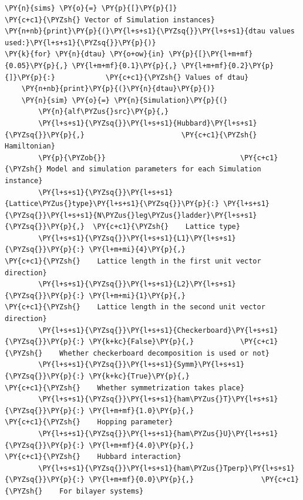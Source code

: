     \begin{tcolorbox}[breakable, size=fbox, boxrule=1pt, pad at break*=1mm,colback=cellbackground, colframe=cellborder]
\begin{Verbatim}[commandchars=\\\{\}]
\PY{n}{sims} \PY{o}{=} \PY{p}{[}\PY{p}{]}                                \PY{c+c1}{\PYZsh{} Vector of Simulation instances}
\PY{n+nb}{print}\PY{p}{(}\PY{l+s+s1}{\PYZsq{}}\PY{l+s+s1}{dtau values used:}\PY{l+s+s1}{\PYZsq{}}\PY{p}{)}
\PY{k}{for} \PY{n}{dtau} \PY{o+ow}{in} \PY{p}{[}\PY{l+m+mf}{0.05}\PY{p}{,} \PY{l+m+mf}{0.1}\PY{p}{,} \PY{l+m+mf}{0.2}\PY{p}{]}\PY{p}{:}            \PY{c+c1}{\PYZsh{} Values of dtau}
    \PY{n+nb}{print}\PY{p}{(}\PY{n}{dtau}\PY{p}{)}
    \PY{n}{sim} \PY{o}{=} \PY{n}{Simulation}\PY{p}{(}
        \PY{n}{alf\PYZus{}src}\PY{p}{,}
        \PY{l+s+s1}{\PYZsq{}}\PY{l+s+s1}{Hubbard}\PY{l+s+s1}{\PYZsq{}}\PY{p}{,}                       \PY{c+c1}{\PYZsh{} Hamiltonian}
        \PY{p}{\PYZob{}}                                \PY{c+c1}{\PYZsh{} Model and simulation parameters for each Simulation instance}
        \PY{l+s+s1}{\PYZsq{}}\PY{l+s+s1}{Lattice\PYZus{}type}\PY{l+s+s1}{\PYZsq{}}\PY{p}{:} \PY{l+s+s1}{\PYZsq{}}\PY{l+s+s1}{N\PYZus{}leg\PYZus{}ladder}\PY{l+s+s1}{\PYZsq{}}\PY{p}{,}  \PY{c+c1}{\PYZsh{}    Lattice type}
        \PY{l+s+s1}{\PYZsq{}}\PY{l+s+s1}{L1}\PY{l+s+s1}{\PYZsq{}}\PY{p}{:} \PY{l+m+mi}{4}\PY{p}{,}                         \PY{c+c1}{\PYZsh{}    Lattice length in the first unit vector direction}
        \PY{l+s+s1}{\PYZsq{}}\PY{l+s+s1}{L2}\PY{l+s+s1}{\PYZsq{}}\PY{p}{:} \PY{l+m+mi}{1}\PY{p}{,}                         \PY{c+c1}{\PYZsh{}    Lattice length in the second unit vector direction}
        \PY{l+s+s1}{\PYZsq{}}\PY{l+s+s1}{Checkerboard}\PY{l+s+s1}{\PYZsq{}}\PY{p}{:} \PY{k+kc}{False}\PY{p}{,}           \PY{c+c1}{\PYZsh{}    Whether checkerboard decomposition is used or not}
        \PY{l+s+s1}{\PYZsq{}}\PY{l+s+s1}{Symm}\PY{l+s+s1}{\PYZsq{}}\PY{p}{:} \PY{k+kc}{True}\PY{p}{,}                    \PY{c+c1}{\PYZsh{}    Whether symmetrization takes place}
        \PY{l+s+s1}{\PYZsq{}}\PY{l+s+s1}{ham\PYZus{}T}\PY{l+s+s1}{\PYZsq{}}\PY{p}{:} \PY{l+m+mf}{1.0}\PY{p}{,}                    \PY{c+c1}{\PYZsh{}    Hopping parameter}
        \PY{l+s+s1}{\PYZsq{}}\PY{l+s+s1}{ham\PYZus{}U}\PY{l+s+s1}{\PYZsq{}}\PY{p}{:} \PY{l+m+mf}{4.0}\PY{p}{,}                    \PY{c+c1}{\PYZsh{}    Hubbard interaction}
        \PY{l+s+s1}{\PYZsq{}}\PY{l+s+s1}{ham\PYZus{}Tperp}\PY{l+s+s1}{\PYZsq{}}\PY{p}{:} \PY{l+m+mf}{0.0}\PY{p}{,}                \PY{c+c1}{\PYZsh{}    For bilayer systems}

\end{Verbatim}
\end{tcolorbox}
